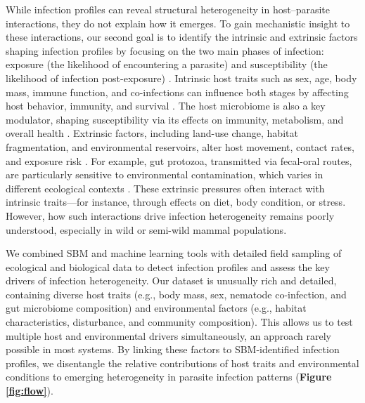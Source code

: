 \documentclass[oneside, a4paper, onecolumn, 11pt]{article}
\begin{document}
While infection profiles can reveal structural heterogeneity in host–parasite interactions, they do not explain how it emerges. To gain mechanistic insight to these interactions, our second goal is to identify the intrinsic and extrinsic factors shaping infection profiles by focusing on the two main phases of infection: exposure (the likelihood of encountering a parasite) and susceptibility (the likelihood of infection post-exposure) \citep{Poulin2007-sl, Johnson2014-vf, Sweeny2022-dm}. Intrinsic host traits such as sex, age, body mass, immune function, and co-infections can influence both stages by affecting host behavior, immunity, and survival \citep{Ezenwa2016-em, Cattadori2008-jo, Mabbott2018-wb}. The host microbiome is also a key modulator, shaping susceptibility via its effects on immunity, metabolism, and overall health \citep{Bernardo-Cravo2020-yr, Gould2018-kj}. Extrinsic factors, including land-use change, habitat fragmentation, and environmental reservoirs, alter host movement, contact rates, and exposure risk \citep{Gajewski2024-wb, Cable2017-xe, Begon2002-or, Gottdenker2014-by}. For example, gut protozoa, transmitted via fecal-oral routes, are particularly sensitive to environmental contamination, which varies in different ecological contexts \citep{Sulaiman2025-ss, Dumetre2012-ds}. These extrinsic pressures often interact with intrinsic traits---for instance, through effects on diet, body condition, or stress. However, how such interactions drive infection heterogeneity remains poorly understood, especially in wild or semi-wild mammal populations.

We combined SBM and machine learning tools with detailed field sampling of ecological and biological data to detect infection profiles and assess the key drivers of infection heterogeneity. Our dataset is unusually rich and detailed, containing diverse host traits (e.g., body mass, sex, nematode co-infection, and gut microbiome composition) and environmental factors (e.g., habitat characteristics, disturbance, and community composition). This allows us to test multiple host and environmental drivers simultaneously, an approach rarely possible in most systems. By linking these factors to SBM-identified infection profiles, we disentangle the relative contributions of host traits and environmental conditions to emerging heterogeneity in parasite infection patterns (\textbf{Figure \ref{fig:flow}}).
\end{document}

